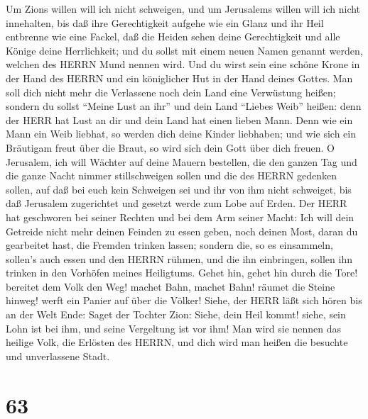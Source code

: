  Um Zions willen will ich nicht schweigen, und um Jerusalems
willen will ich nicht innehalten, bis daß ihre Gerechtigkeit aufgehe wie
ein Glanz und ihr Heil entbrenne wie eine Fackel,  daß die
Heiden sehen deine Gerechtigkeit und alle Könige deine Herrlichkeit; und
du sollst mit einem neuen Namen genannt werden, welchen des HERRN Mund
nennen wird.  Und du wirst sein eine schöne Krone in der
Hand des HERRN und ein königlicher Hut in der Hand deines Gottes.
 Man soll dich nicht mehr die Verlassene noch dein Land eine
Verwüstung heißen; sondern du sollst ``Meine Lust an ihr'' und dein Land
``Liebes Weib'' heißen: denn der HERR hat Lust an dir und dein Land hat
einen lieben Mann.  Denn wie ein Mann ein Weib liebhat, so
werden dich deine Kinder liebhaben; und wie sich ein Bräutigam freut
über die Braut, so wird sich dein Gott über dich freuen.  O
Jerusalem, ich will Wächter auf deine Mauern bestellen, die den ganzen
Tag und die ganze Nacht nimmer stillschweigen sollen und die des HERRN
gedenken sollen, auf daß bei euch kein Schweigen sei  und
ihr von ihm nicht schweiget, bis daß Jerusalem zugerichtet und gesetzt
werde zum Lobe auf Erden.  Der HERR hat geschworen bei
seiner Rechten und bei dem Arm seiner Macht: Ich will dein Getreide
nicht mehr deinen Feinden zu essen geben, noch deinen Most, daran du
gearbeitet hast, die Fremden trinken lassen;  sondern die,
so es einsammeln, sollen's auch essen und den HERRN rühmen, und die ihn
einbringen, sollen ihn trinken in den Vorhöfen meines Heiligtums.
 Gehet hin, gehet hin durch die Tore! bereitet dem Volk den
Weg! machet Bahn, machet Bahn! räumet die Steine hinweg! werft ein
Panier auf über die Völker!  Siehe, der HERR läßt sich
hören bis an der Welt Ende: Saget der Tochter Zion: Siehe, dein Heil
kommt! siehe, sein Lohn ist bei ihm, und seine Vergeltung ist vor ihm!
 Man wird sie nennen das heilige Volk, die Erlösten des
HERRN, und dich wird man heißen die besuchte und unverlassene Stadt.

\hypertarget{section-62}{%
\section{63}\label{section-62}}

